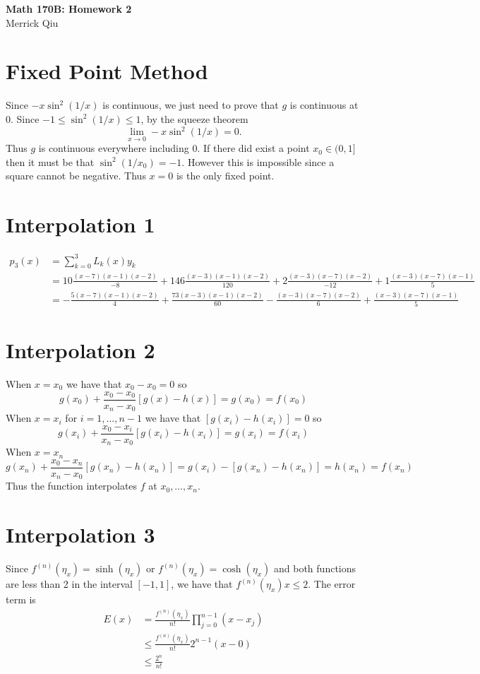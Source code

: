 \documentclass{article}
\begin{document}
\begin{center}
	\huge{\bf Math 170B: Homework 2} \\
	Merrick Qiu
\end{center}

\section*{Fixed Point Method}
Since $-x\sin^2(1/x)$ is continuous, we just need to prove 
that $g$ is continuous at $0$.
Since $-1 \leq \sin^2 (1/x)\leq 1$,
by the squeeze theorem
\[
	\lim_{x \to 0} -x\sin^2(1/x) = 0.
\]
Thus $g$ is continuous everywhere including $0$.
If there did exist a point $x_0 \in (0,1]$ then it must
be that $\sin^2 (1/x_0) = -1$. However this is impossible
since a square cannot be negative. Thus $x = 0$ is the only fixed point.
	
\section*{Interpolation 1}
\begin{align*}
	p_3(x) &= \sum_{k=0}^3 L_k(x)y_k \\
	&= 10\frac{(x-7)(x-1)(x-2)}{-8} +  146\frac{(x-3)(x-1)(x-2)}{120} + 2\frac{(x-3)(x-7)(x-2)}{-12} + 1\frac{(x-3)(x-7)(x-1)}{5} \\
	&= -\frac{5(x-7)(x-1)(x-2)}{4} +  \frac{73(x-3)(x-1)(x-2)}{60} - \frac{(x-3)(x-7)(x-2)}{6} + \frac{(x-3)(x-7)(x-1)}{5}
\end{align*}

\section*{Interpolation 2}
When $x = x_0$ we have that $x_0 - x_0 = 0$ so
\[
	g(x_0) + \frac{x_0 - x_0}{x_n - x_0}[g(x) - h(x)] =  g(x_0) = f(x_0) 
\]
When  $x = x_i$ for $i = 1,\dots,n-1$ we have that $[g(x_i) - h(x_i)] = 0$ so
\[
	g(x_i) + \frac{x_0 - x_i}{x_n - x_0}[g(x_i) - h(x_i)] = g(x_i) = f(x_i)
\]
When $x = x_n$ 
\[
	g(x_n) + \frac{x_0 - x_n}{x_n - x_0}[g(x_n) - h(x_n)] = g(x_i) - [g(x_n) - h(x_n)] = h(x_n) = f(x_n)
\]
Thus the function interpolates $f$ at $x_0,\dots,x_n$.

\section*{Interpolation 3}
Since $f^{(n)}(\eta_x) = \sinh(\eta_x)$ or $f^{(n)}(\eta_x) = \cosh(\eta_x)$
and both functions are less than 2 in the interval $[-1,1]$, we have that 
$f^{(n)}(\eta_x)x \leq 2$.
The error term is 
\begin{align*}
	E(x) &= \frac{f^{(n)}(\eta_x)}{n!}\prod_{j=0}^{n-1}(x-x_j) \\
	&\leq \frac{f^{(n)}(\eta_x)}{n!}2^{n-1}(x-0) \\
	&\leq \frac{2^{n}}{n!}
\end{align*}
\end{document}
